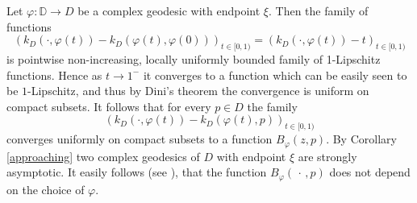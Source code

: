 \documentclass[11pt, reqno]{amsart}
\numberwithin{equation}{section}
\theoremstyle{definition}
\newcommand{\D}{\mathbb{D}}
\begin{document}
{		\proof
	
		Let $\varphi\colon \D\to D$ be a complex geodesic with endpoint $\xi$.
		Then the family of functions $$( k_D(\cdot,\varphi(t))-k_D(\varphi(t),\varphi(0)))_{t\in[0,1)}=( k_D(\cdot,\varphi(t))-t)_{t\in[0,1)}$$ is pointwise non-increasing, locally uniformly bounded  family of 1-Lipschitz functions. Hence as $t\to1^-$ it converges to a function which can be easily seen to be $1$-Lipschitz, and thus by Dini's theorem the convergence is uniform on compact subsets. It follows that 
		for every $p\in D$ the family $$( k_D(\cdot,\varphi(t))-k_D(\varphi(t),p))_{t\in[0,1)}$$ converges uniformly on compact subsets to a function $B_\varphi(z,p)$.
		 By Corollary \ref{approaching} two complex geodesics of $D$ with endpoint $\xi$ are strongly asymptotic. It easily follows (see  \cite[Proposition 3.3]{AFGG}), that  the function  $B_{\varphi}(\,\cdot\,,p)$ does not depend on the choice of $\varphi$.
		
}
\end{document}
